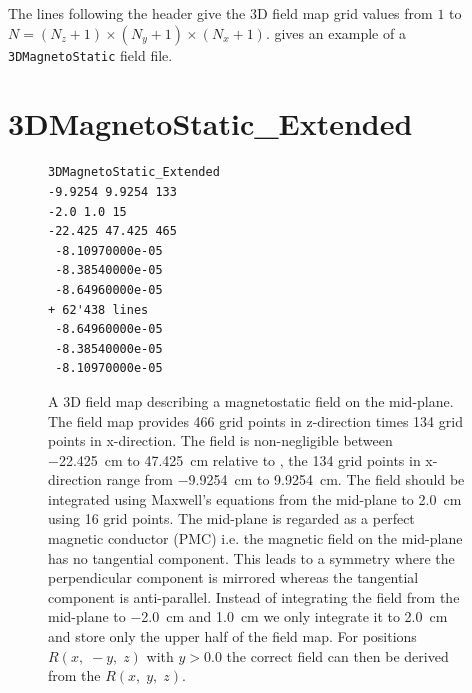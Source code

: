 The lines following the header give the 3D field map grid values from $1$ to $N= (N_{z} + 1) \times (N_{y} + 1) \times (N_{x} + 1)$.
 gives an example of a \texttt{3DMagnetoStatic} field file.

\newpage
\section{3DMagnetoStatic\_Extended}
\label{sec:3DMagnetoStatic_Extended}
\begin{figure}[h]
  \begin{fmpage}
\begin{verbatim}
3DMagnetoStatic_Extended
-9.9254 9.9254 133
-2.0 1.0 15
-22.425 47.425 465
 -8.10970000e-05
 -8.38540000e-05
 -8.64960000e-05
+ 62'438 lines
 -8.64960000e-05
 -8.38540000e-05
 -8.10970000e-05
\end{verbatim}
  \end{fmpage}
  \caption[Example of a 3DMagnetoStatic\_Extended field map]{A 3D field map describing a magnetostatic field on the mid-plane. The field map provides 466 grid points in z-direction times 134 grid points in x-direction. The field is non-negligible between \SI{-22.425}{\centi\meter} to \SI{47.425}{\centi\meter} relative to , the 134 grid points in x-direction range from \SI{-9.9254}{\centi\meter} to \SI{9.9254}{\centi\meter}. The field should be integrated using Maxwell's equations from the mid-plane to \SI{2.0}{\centi\meter} using 16 grid points. The mid-plane is regarded as a perfect magnetic conductor (PMC) i.e. the magnetic field on the mid-plane has no tangential component. This leads to a symmetry where the perpendicular component is mirrored whereas the tangential component is anti-parallel. Instead of integrating the field from the mid-plane to \SI{-2.0}{\centi\meter} and \SI{1.0}{\centi\meter} we only integrate it to \SI{+2.0}{\centi\meter} and store only the upper half of the field map. For positions $R(x,\;-y,\;z)$ with $y > 0.0$ the correct field can then be derived from the $R(x,\;y,\;z)$.}
  \label{fig:3DMagnetoStatic_Extended}
\end{figure}

